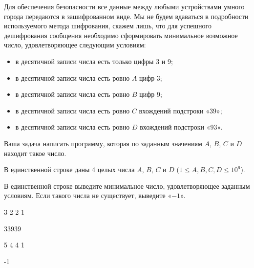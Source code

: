 
Для обеспечения
безопасности все данные между любыми устройствами умного города передаются в
зашифрованном виде. Мы не будем вдаваться в подробности используемого метода
шифрования, скажем лишь, что для успешного дешифрования сообщения необходимо
сформировать минимальное возможное число, удовлетворяющее следующим условиям:

\begin{itemize}
    \item в десятичной записи числа есть только цифры 3 и 9;
    \item в десятичной записи числа есть ровно $A$  цифр 3;
    \item в десятичной записи числа есть ровно $B$  цифр 9;
    \item в десятичной записи числа есть ровно $C$  вхождений подстроки «39»;
    \item в десятичной записи числа есть ровно $D$  вхождений подстроки «93».
\end{itemize}

Ваша задача
написать программу, которая по заданным значениям $ A $, $ B $, $ C $ и $ D $ находит такое число.


В единственной
строке даны 4 целых числа $ A $,
$ B $,
$ C $ и $ D $ ($ 1 \le A, B, C, D \le 10^6 $).

\outputfmtSection

В единственной
строке выведите минимальное число, удовлетворяющее заданным условиям. Если
такого числа не существует, выведите «$ -1 $».

\begin{myverbbox}[\small]{\vinput}
    3 2 2 1
\end{myverbbox}
\begin{myverbbox}[\small]{\voutput}
    33939
\end{myverbbox}

\begin{myverbbox}[\small]{\vinput}
    5 4 4 1
\end{myverbbox}
\begin{myverbbox}[\small]{\voutput}
    -1
\end{myverbbox}

